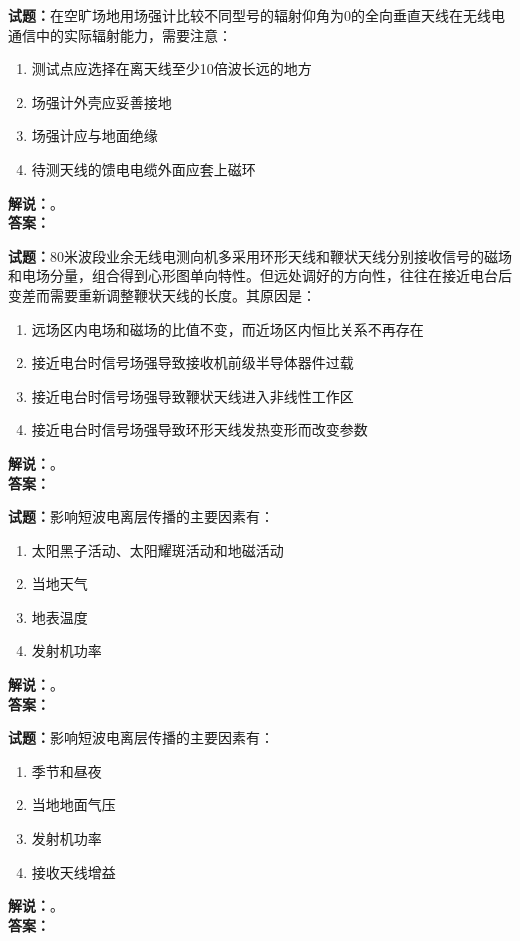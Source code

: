 \documentclass{ctexbook}
\begin{document}
\noindent\textbf{试题：}在空旷场地用场强计比较不同型号的辐射仰角为0的全向垂直天线在无线电通信中的实际辐射能力，需要注意：
\begin{enumerate}[leftmargin=3em]
\item 测试点应选择在离天线至少10倍波长远的地方
\item 场强计外壳应妥善接地
\item 场强计应与地面绝缘
\item 待测天线的馈电电缆外面应套上磁环
\end{enumerate}
\noindent\textbf{解说：}\textbf{}。\\\noindent\textbf{答案：}

\bigskip




\noindent\textbf{试题：}80米波段业余无线电测向机多采用环形天线和鞭状天线分别接收信号的磁场和电场分量，组合得到心形图单向特性。但远处调好的方向性，往往在接近电台后变差而需要重新调整鞭状天线的长度。其原因是：
\begin{enumerate}[leftmargin=3em]
\item 远场区内电场和磁场的比值不变，而近场区内恒比关系不再存在
\item 接近电台时信号场强导致接收机前级半导体器件过载
\item 接近电台时信号场强导致鞭状天线进入非线性工作区
\item 接近电台时信号场强导致环形天线发热变形而改变参数
\end{enumerate}
\noindent\textbf{解说：}\textbf{}。\\\noindent\textbf{答案：}

\bigskip




\noindent\textbf{试题：}影响短波电离层传播的主要因素有：
\begin{enumerate}[leftmargin=3em]
\item 太阳黑子活动、太阳耀斑活动和地磁活动
\item 当地天气
\item 地表温度
\item 发射机功率
\end{enumerate}
\noindent\textbf{解说：}\textbf{}。\\\noindent\textbf{答案：}

\bigskip




\noindent\textbf{试题：}影响短波电离层传播的主要因素有：
\begin{enumerate}[leftmargin=3em]
\item 季节和昼夜
\item 当地地面气压
\item 发射机功率
\item 接收天线增益
\end{enumerate}
\noindent\textbf{解说：}\textbf{}。\\\noindent\textbf{答案：}
\end{document}
